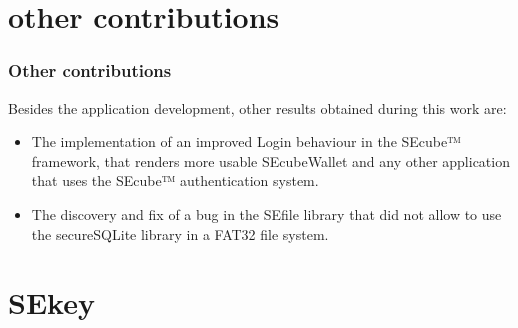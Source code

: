 \documentclass[14pt,usenames,dvipsnames]{beamer}
\begin{document}
\section*{other contributions}

\begin{frame}
		\frametitle{Other contributions}
	Besides the application development, other results obtained during this work are:
	\begin{itemize}
	\setlength\itemsep{10pt}
		\item The implementation of an improved Login behaviour in the SEcube™ framework, that renders more usable SEcubeWallet and any other application that uses the SEcube™ authentication system.
		
		\item The discovery and fix of a bug in the SEfile library that did not allow to use the secureSQLite library in a FAT32 file system.
	\end{itemize}
		
\end{frame}

\section*{SEkey}
\end{document}
